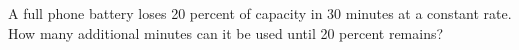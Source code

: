 A full phone battery loses 20 percent of capacity in 30 minutes at a constant rate. How many additional minutes can it be used until 20 percent remains?
